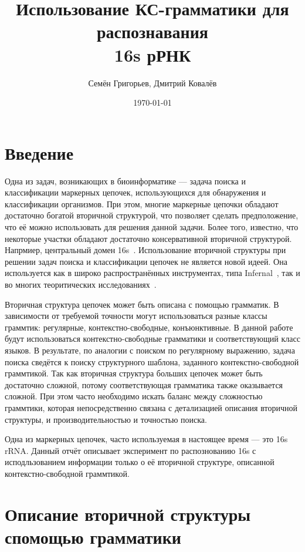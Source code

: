 \documentclass[12pt]{article}  %
\title{Использование КС-грамматики для распознавания \\ 16s рРНК}
\author{Семён Григорьев, Дмитрий Ковалёв}
\date{\today}
\theoremstyle{remark}
\begin{document}

\maketitle 

\section{Введение}

Одна из задач, возникающих в биоинформатике --- задача поиска и классификации маркерных цепочек, использующихся для обнаружения и классификации организмов.
При этом, многие маркерные цепочки обладают достаточно богатой вторичной структурой, что позволяет сделать предположение, что её можно использовать для решения данной задачи.
Более того, известно, что некоторые участки обладают достаточно консервативной вторичной структурой.
Напрмиер, центральный домен 16s~\cite{!!!}.
Использование вторичной структуры при решении задач поиска и классификации цепочек не является новой идеей.
Она используется как в широко распространённых инструментах, типа Infernal~\cite{!!!}, так и во многих теоритических исследованиях~\cite{!!!,!!!,!!!}.

Вторичная структура цепочек может быть описана с помощью грамматик. 
В зависимости от требуемой точности могут использоваться разные классы граммтик: регулярные, контекстно-свободные, конъюнктивные.
В данной работе будут использоваться контекстно-свободные грамматики и соответствующий класс языков.
В результате, по аналогии с поиском по регулярному выражению, задача поиска сведётся к поиску структурного шаблона, заданного контекстно-свободной граммтикой.
Так как вторичная структура больших цепочек может быть достаточно сложной, потому соответствующая грамматика также оказывается сложной.
При этом часто необходимо искать баланс между сложностью граммтики, которая непосредственно связана с детализацией описания вторичной структуры, и производительностью и точностью поиска.

Одна из маркерных цепочек, часто используемая в настоящее время --- это 16s rRNA.
Данный отчёт описывает эксперимент по распознованию 16s с исподльзованием информации только о её вторичной структуре, описанной контекстно-свободной граммтикой.

\section{Описание вторичной структуры спомощью грамматики}
\end{document}
